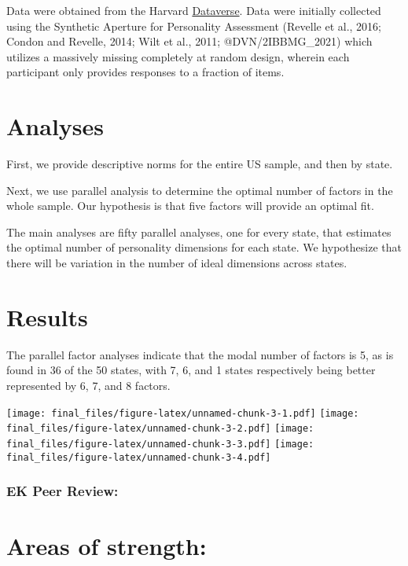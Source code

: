 \documentclass[
]{article}
\begin{document}
Data were obtained from the Harvard \href{https://dataverse.harvard.edu/dataverse/SAPA-Project}{Dataverse}. Data were initially collected using the Synthetic Aperture for Personality Assessment (Revelle et al., 2016; Condon and Revelle, 2014; Wilt et al., 2011; @DVN/2IBBMG\_2021) which utilizes a massively missing completely at random design, wherein each participant only provides responses to a fraction of items.

\hypertarget{analyses}{%
\section{Analyses}\label{analyses}}

First, we provide descriptive norms for the entire US sample, and then by state.

Next, we use parallel analysis to determine the optimal number of factors in the whole sample. Our hypothesis is that five factors will provide an optimal fit.

The main analyses are fifty parallel analyses, one for every state, that estimates the optimal number of personality dimensions for each state. We hypothesize that there will be variation in the number of ideal dimensions across states.

\newpage

\hypertarget{results}{%
\section{Results}\label{results}}

The parallel factor analyses indicate that the modal number of factors is 5, as is found in 36 of the 50 states, with 7, 6, and 1 states respectively being better represented by 6, 7, and 8 factors.

\texttt{[image: final\_files/figure-latex/unnamed-chunk-3-1.pdf]} \texttt{[image: final\_files/figure-latex/unnamed-chunk-3-2.pdf]} \texttt{[image: final\_files/figure-latex/unnamed-chunk-3-3.pdf]} \texttt{[image: final\_files/figure-latex/unnamed-chunk-3-4.pdf]}

\hypertarget{ek-peer-review}{%
\subsubsection{EK Peer Review:}\label{ek-peer-review}}

\hypertarget{areas-of-strength}{%
\section{Areas of strength:}\label{areas-of-strength}}
\end{document}
